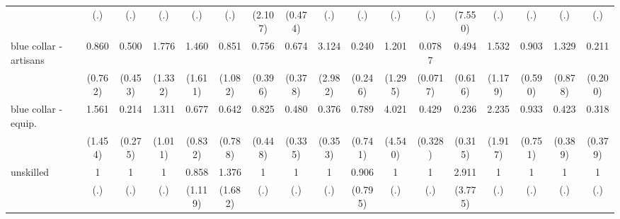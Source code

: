 {\begin{tabular}{l*{16}{c}}
                    &         (.)         &         (.)         &         (.)         &         (.)         &         (.)         &     (2.107)         &     (0.474)         &         (.)         &         (.)         &         (.)         &         (.)         &     (7.550)         &         (.)         &         (.)         &         (.)         &         (.)         \\
[1em]
blue collar - artisans&       0.860         &       0.500         &       1.776         &       1.460         &       0.851         &       0.756         &       0.674         &       3.124         &       0.240         &       1.201         &      0.0787\sym{**} &       0.494         &       1.532         &       0.903         &       1.329         &       0.211         \\
                    &     (0.762)         &     (0.453)         &     (1.332)         &     (1.611)         &     (1.082)         &     (0.396)         &     (0.378)         &     (2.982)         &     (0.246)         &     (1.295)         &    (0.0717)         &     (0.616)         &     (1.179)         &     (0.590)         &     (0.878)         &     (0.200)         \\
[1em]
blue collar - equip.&       1.561         &       0.214         &       1.311         &       0.677         &       0.642         &       0.825         &       0.480         &       0.376         &       0.789         &       4.021         &       0.429         &       0.236         &       2.235         &       0.933         &       0.423         &       0.318         \\
                    &     (1.454)         &     (0.275)         &     (1.011)         &     (0.832)         &     (0.788)         &     (0.448)         &     (0.335)         &     (0.353)         &     (0.741)         &     (4.540)         &     (0.328)         &     (0.315)         &     (1.917)         &     (0.751)         &     (0.389)         &     (0.379)         \\
[1em]
unskilled           &           1         &           1         &           1         &       0.858         &       1.376         &           1         &           1         &           1         &       0.906         &           1         &           1         &       2.911         &           1         &           1         &           1         &           1         \\
                    &         (.)         &         (.)         &         (.)         &     (1.119)         &     (1.682)         &         (.)         &         (.)         &         (.)         &     (0.795)         &         (.)         &         (.)         &     (3.775)         &         (.)         &         (.)         &         (.)         &         (.)         \\

\end{tabular}}
